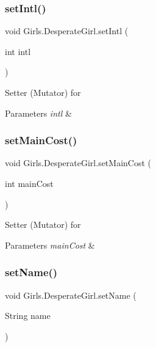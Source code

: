 \subsubsection{\texorpdfstring{set\+Intl()}{setIntl()}}
{\footnotesize\ttfamily void Girls.\+Desperate\+Girl.\+set\+Intl (\begin{DoxyParamCaption}\item[{int}]{intl }\end{DoxyParamCaption})\hspace{0.3cm}{\ttfamily [inline]}}

Setter (Mutator) for 
\begin{DoxyParams}{Parameters}
{\em intl} & \\
\hline
\end{DoxyParams}
\mbox{\label{class_girls_1_1_desperate_girl_aa8242123882557dfde4bdd0a597123ad}} 
\subsubsection{\texorpdfstring{set\+Main\+Cost()}{setMainCost()}}
{\footnotesize\ttfamily void Girls.\+Desperate\+Girl.\+set\+Main\+Cost (\begin{DoxyParamCaption}\item[{int}]{main\+Cost }\end{DoxyParamCaption})\hspace{0.3cm}{\ttfamily [inline]}}

Setter (Mutator) for 
\begin{DoxyParams}{Parameters}
{\em main\+Cost} & \\
\hline
\end{DoxyParams}
\mbox{\label{class_girls_1_1_desperate_girl_a586ddff032ee66768ba5d5a730b26c2e}} 
\subsubsection{\texorpdfstring{set\+Name()}{setName()}}
{\footnotesize\ttfamily void Girls.\+Desperate\+Girl.\+set\+Name (\begin{DoxyParamCaption}\item[{String}]{name }\end{DoxyParamCaption})\hspace{0.3cm}{\ttfamily [inline]}}

